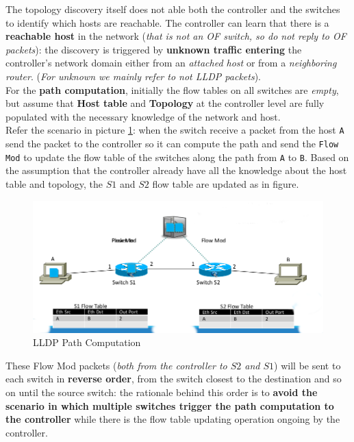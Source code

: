 \documentclass[10pt,a4paper]{report}
\theoremstyle{definition}
\begin{document}
The topology discovery itself does not able both the controller and the switches to identify which hosts are reachable.
The controller can learn that there is a \textbf{reachable host} in the network (\textit{that is not an OF switch, so do not reply to OF packets}): the discovery is triggered by \textbf{unknown traffic entering} the controller's network domain either from an \textit{attached host} or from a \textit{neighboring router}. (\textit{For unknown we mainly refer to not LLDP packets}).\\
For the \textbf{path computation}, initially the flow tables on all switches are \textit{empty}, but assume that \textbf{Host table} and \textbf{Topology} at the  controller level are fully populated with the necessary knowledge of the network and host.\\
Refer the scenario in picture \ref{path-comp-lldp}: when the switch receive a packet from the host \texttt{A} send the packet to the controller so it can compute the path and send the \texttt{Flow Mod} to update the flow table of the switches along the path from \texttt{A} to \texttt{B}. Based on the assumption that the controller already have all the knowledge about the host table and topology, the $S1$ and $S2$ flow table are updated as in figure.
\begin{figure}[h!]
	\centering\includegraphics[scale=0.45]{images/host-reachability.png}
	\caption{LLDP Path Computation}
	\label{path-comp-lldp}
\end{figure}


These Flow Mod packets (\textit{both from the controller to $S2$ and $S1$}) will be sent to each switch in \textbf{reverse order}, from the switch closest to the destination and so on until the source switch: the rationale behind this order is to \textbf{avoid the scenario in which multiple switches trigger the path computation to the controller} while there is the flow table updating operation ongoing by the controller.
\end{document}
